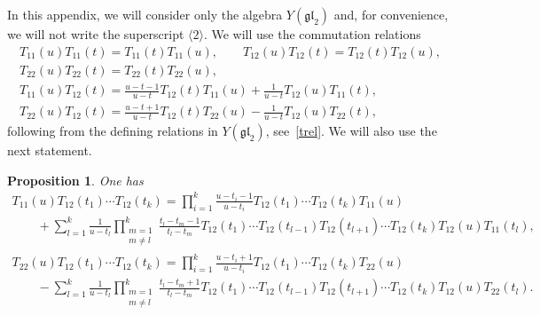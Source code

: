 \documentclass[10pt,a4paper]{amsart}
\numberwithin{equation}{section}
\newtheorem{Proposition}[Theorem]{Proposition}
 { \theoremstyle{definition}
\newtheorem{Definition}[Theorem]{Definition}
\newtheorem*{Example}{Example}
\newtheorem*{Remark}{Remark} }
\newcommand\ltwo{\langle 2\rangle}
\begin{document}
In this appendix, we will consider only the algebra $Y(\mathfrak{gl}_2)$ and, for convenience, we will not write the superscript $\ltwo$.
We will use the commutation relations
\begin{gather}
T_{11} (u)T_{11} (t)=T_{11} (t)T_{11} (u),\qquad
 T_{12} (u) T_{12} (t)= T_{12} (t) T_{12} (u),\nonumber\\
 T_{22} (u) T_{22} (t)= T_{22} (t) T_{22} (u),\label{2com1}
\\ \label{2com2}
T_{11} (u) T_{12} (t)=\frac{u-t-1}{u-t} T_{12} (t) T_{11} (u) +\frac{1}{u-t} T_{12} (u) T_{11} (t),
\\ \label{2com3}
T_{22} (u) T_{12} (t)=\frac{u-t+1}{u-t} T_{12} (t) T_{22} (u)-\frac{1}{u-t} T_{12} (u) T_{22} (t),
\end{gather}
following from the defining relations in $Y(\mathfrak{g l}_{2})$, see~\eqref{trel}. We will also use the next statement.
\begin{Proposition}
One has
\begin{gather}
T_{11} (u) T_{12} (t_1) \cdots T_{12} (t_k)=\prod_{i=1}^k\frac{u-t_i-1}{u-t_i} T_{12} (t_1)\cdots T_{12} (t_k) T_{11} (u)\label{ABf}\\[-1mm]
\qquad{}+\sum_{l=1}^k \frac{1}{u-t_l}\prod_{\substack{m=1\\m\neq l}}^k \frac{t_l-t_m-1}{t_l-t_m} T_{12} (t_1)\cdots T_{12} (t_{l-1}) T_{12} (t_{l+1})\cdots T_{12} (t_k) T_{12} (u)T_{11} (t_l),\nonumber
\\[-1mm]
T_{22} (u) T_{12} (t_1) \cdots T_{12} (t_k)=\prod_{i=1}^k\frac{u-t_i+1}{u-t_i} T_{12} (t_1)\cdots T_{12} (t_k) T_{22} (u)\label{DBf}\\[-1mm]
\qquad{} -\sum_{l=1}^k \frac{1}{u-t_l}\prod_{\substack{m=1\\m\neq l}}^k \frac{t_l-t_m+1}{t_l-t_m} T_{12} (t_1)\cdots T_{12} (t_{l-1}) T_{12} (t_{l+1})\cdots T_{12} (t_k) T_{12} (u)T_{22} (t_l).\nonumber
\end{gather}
\end{Proposition}
\end{document}

